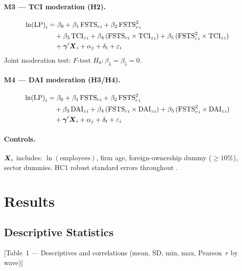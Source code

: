 \documentclass[12pt,a4paper]{article}
\begin{document}
\paragraph{M3 --- TCI moderation (H2).}
\begin{align}
  {\ln(\mathrm{LP})}_{i} &= \beta_{0} + \beta_{1}\,{\mathrm{FSTS}_{c}}_{i} + \beta_{2}\,{\mathrm{FSTS}_{c}^{2}}_{i}
    \notag \\
    &\quad + \beta_{3}\,{\mathrm{TCI}_{z}}_{i}
    + \beta_{4}\,({\mathrm{FSTS}_{c}}_{i} \times {\mathrm{TCI}_{z}}_{i})
    + \beta_{5}\,({\mathrm{FSTS}_{c}^{2}}_{i} \times {\mathrm{TCI}_{z}}_{i})
    \notag \\
    &\quad + \boldsymbol{\gamma}'\boldsymbol{X}_{i} + {\alpha_{j}} + {\delta_{t}} + \varepsilon_{i}
  \label{eq:M3}
\end{align}
Joint moderation test: \(F\)-test \(H_{0}\colon \beta_{4} = \beta_{5} = 0\).

\paragraph{M4 --- DAI moderation (H3/H4).}
\begin{align}
  {\ln(\mathrm{LP})}_{i} &= \beta_{0} + \beta_{1}\,{\mathrm{FSTS}_{c}}_{i} + \beta_{2}\,{\mathrm{FSTS}_{c}^{2}}_{i}
    \notag \\
    &\quad + \beta_{3}\,{\mathrm{DAI}_{z}}_{i}
    + \beta_{4}\,({\mathrm{FSTS}_{c}}_{i} \times {\mathrm{DAI}_{z}}_{i})
    + \beta_{5}\,({\mathrm{FSTS}_{c}^{2}}_{i} \times {\mathrm{DAI}_{z}}_{i})
    \notag \\
    &\quad + \boldsymbol{\gamma}'\boldsymbol{X}_{i} + {\alpha_{j}} + {\delta_{t}} + \varepsilon_{i}
  \label{eq:M4}
\end{align}

\paragraph{Controls.}
\(\boldsymbol{X}_{i}\) includes: \(\ln(\text{employees})\), firm age,
foreign-ownership dummy (\(\geq 10\%\)), sector dummies.
HC1 robust standard errors throughout \parencite{LongErvin2000}.

\section{Results}
\label{sec:results}

\subsection{Descriptive Statistics}

[Table~1 --- Descriptives and correlations (mean, SD, min, max,
Pearson~\(r\) by wave)]
\end{document}
